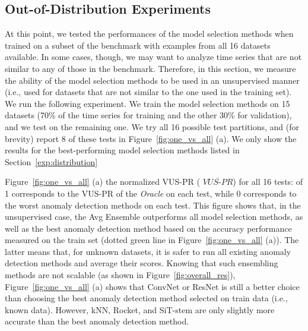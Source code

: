 \subsection{Out-of-Distribution Experiments}
\label{exp:sup2unsup}

At this point, we tested the performances of the model selection methods when trained on a subset of the benchmark with examples from all 16 datasets available.  In some cases, though, we may want to analyze time series that are not similar to any of those in the benchmark. Therefore, in this section, we measure the ability of the model selection methods to be used in an unsupervised manner (i.e., used for datasets that are not similar to the one used in the training set). We run the following experiment. We train the model selection methods on 15 datasets (70\% of the time series for training and the other 30\% for validation), and we test on the remaining one. We try all 16 possible test partitions, and (for brevity) report 8 of these tests in Figure~\ref{fig:one_vs_all} (a). We only show the results for the best-performing model selection methods listed in Section~\ref{exp:distribution}

Figure~\ref{fig:one_vs_all} (a)  the normalized VUS-PR ( $\overline{VUS\text{-}PR}$) for all 16 tests:  of 1 corresponds to the VUS-PR of the \emph{Oracle} on each test, while 0 corresponds to the worst anomaly detection methods on each test. This figure shows that, in the unsupervised case, the Avg Ensemble outperforms all model selection methods, as well as the best anomaly detection method based on the accuracy performance measured on the train set (dotted green line in Figure~\ref{fig:one_vs_all} (a)). The latter means that, for unknown datasets, it is safer to run all existing anomaly detection methods and average their scores. Knowing that such ensembling methods are not scalable (as shown in Figure~\ref{fig:overall_res}), Figure~\ref{fig:one_vs_all} (a) shows that ConvNet or ResNet is still a better choice than choosing the best anomaly detection method selected on train data (i.e., known data). However, kNN, Rocket, and SiT-stem are only slightly more accurate than the best anomaly detection method.

